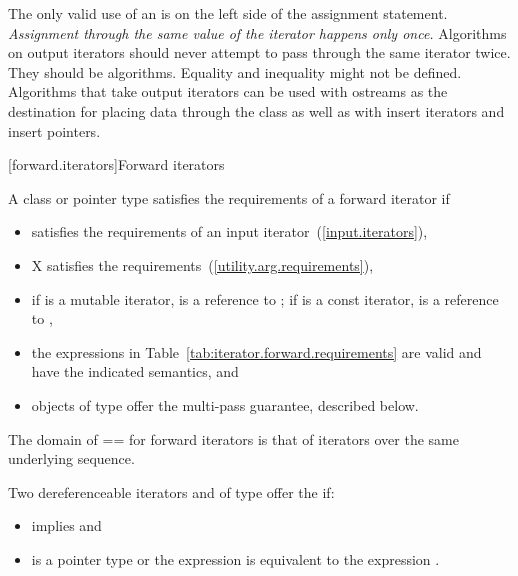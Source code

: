 \pnum
\enternote
The only valid use of an
is on the left side of the assignment statement.
\textit{Assignment through the same value of the iterator happens only once.}
Algorithms on output iterators should never attempt to pass through the same iterator twice.
They should be
algorithms.
Equality and inequality might not be defined.
Algorithms that take output iterators can be used with ostreams as the destination
for placing data through the
class as well as with insert iterators and insert pointers.
\exitnote

[forward.iterators]{Forward iterators}

\pnum
A class or pointer type
satisfies the requirements of a forward iterator if

\begin{itemize}
\item {} satisfies the requirements of an input iterator~(\ref{input.iterators}),

\item X satisfies the 
requirements~(\ref{utility.arg.requirements}),

\item if  is a mutable iterator,  is a reference to ;
if  is a const iterator,  is a reference to ,

\item the expressions in Table~\ref{tab:iterator.forward.requirements}
are valid and have the indicated semantics, and

\item objects of type  offer the multi-pass guarantee, described below.
\end{itemize}

\pnum
The domain of == for forward iterators is that of iterators over the same
underlying sequence.

\pnum
Two dereferenceable iterators  and  of type  offer the
 if:

\begin{itemize}
\item {} implies  and
\item {} is a pointer type or the expression
 is equivalent to the expression .
\end{itemize}

